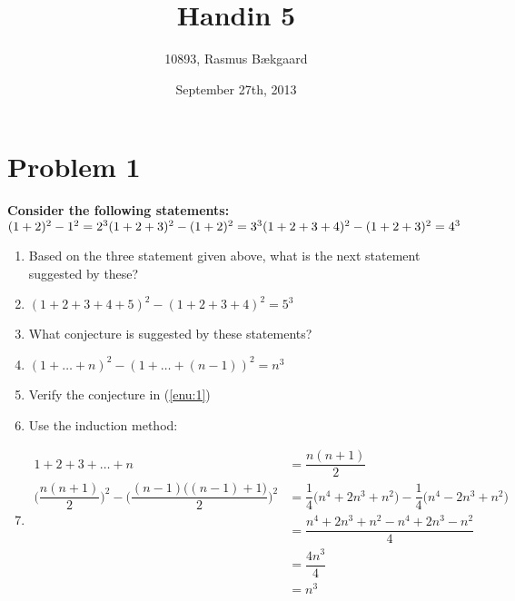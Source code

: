 \documentclass[english,11pt,a4paper]{article}
\title{Handin 5}
\author{10893, Rasmus Bækgaard}
\date{September 27th, 2013}
\begin{document}
\maketitle

\section*{Problem 1}
\textbf{Consider the following statements:}
\\
$(1+2)^2-1^2=2^3\\
(1+2+3)^2-(1+2)^2=3^3\\
(1+2+3+4)^2-(1+2+3)^2=4^3$
\begin{enumerate}[a]
\item Based on the three statement given above, what is the next statement suggested by these?
\item[] $(1+2+3+4+5)^2-(1+2+3+4)^2=5^3$
\item \label{enu:1}What conjecture is suggested by these statements?
\item[] $(1+\ldots+n)^2-(1+\ldots+(n-1))^2=n^3$
\item Verify the conjecture in (\ref{enu:1})
\item[] Use the induction method:
\item[] 
\begin{align}
1+2+3+\ldots+n&=\dfrac{n(n+1)}{2}\\
\bigg(\dfrac{n(n+1)}{2}\bigg)^2-\Bigg(\dfrac{(n-1)\Big((n-1)+1\Big)}{2}\Bigg)^2
	&=\dfrac{1}{4}\Big(n^4+2n^3+n^2\Big)-\dfrac{1}{4}\Big(n^4-2n^3+n^2\Big)\\
	&=\dfrac{n^4+2n^3+n^2-n^4+2n^3-n^2}{4}\\
	&=\dfrac{4n^3}{4}\\
	&=n^3
\end{align}
\end{enumerate}
\end{document}
